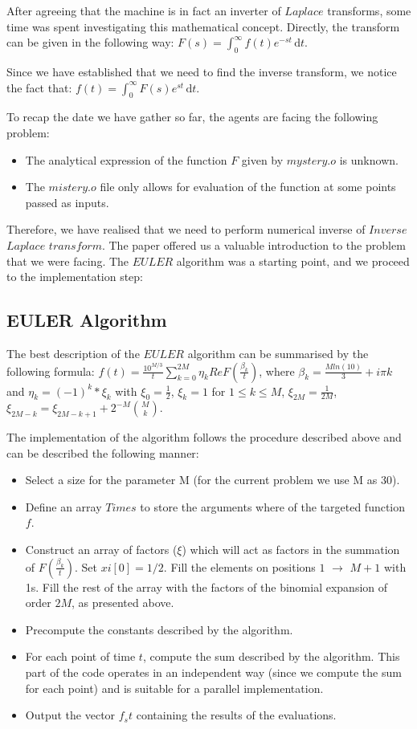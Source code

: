 After agreeing that the machine is in fact an inverter of $Laplace$ transforms, some time was spent investigating 
this mathematical concept. Directly, the transform can be given in the following way:
$F(s) =\int_0^\infty \! f(t)e^{-st} \, \mathrm{d}t$.

Since we have established that we need to find the inverse transform, we notice the fact that:
$f(t) =\int_0^\infty \! F(s)e^{st} \, \mathrm{d}t$. 
\newline

To recap the date we have  gather so far, the agents are facing the following problem:
\begin{itemize}
\item{The analytical expression of the function $F$ given by $mystery.o$ is unknown. }
\item{The $mistery.o$ file only allows for evaluation of the function at some points passed as inputs. }
\end{itemize}

Therefore, we have realised that we need to perform numerical inverse of $Inverse$ $Laplace$ $transform$.
The paper offered us a valuable introduction to the problem that we were facing.
The $EULER$ algorithm was a starting point, and we proceed to the implementation step:

\subsection{EULER Algorithm}
The best description\cite{abate} of the $EULER$ algorithm can be summarised by the following formula:
$f(t) = \frac{10^{M/3}}{t} \sum\limits_{k=0}^{2M} {\eta_k Re F(\frac{\beta_k}{t}) }$, where $\beta_k = \frac{M ln(10)}{3} + i\pi k$ and $\eta_k = (-1)^{k} *\xi_k$ with $\xi_0 = \frac{1}{2}$, $\xi_k = 1$ for $1 \leq k \leq M$, $\xi_{2M} = \frac{1}{2M}$, $\xi_{2M-k} = \xi_{2M-k+1}+2^{-M}\binom{M}{k}$.
\newline

The implementation of the algorithm follows the procedure described above and can be described the following manner:
\begin{itemize}
\item{Select a size for the parameter M (for the current problem we use M as 30).}
\item{Define an array $Times$ to store the arguments where of the targeted function $f$.}
\item{Construct an array of factors ($\xi$) which will act as factors in the summation of $F(\frac{\beta_k}{t})$. Set $xi[0] = 1/2$. Fill the elements on positions $1$ $\to$ $M+1$ with 1s. Fill the rest of the array with the factors of the binomial expansion of order $2M$, as presented above.}
\item{Precompute the constants described by the algorithm.}
\item{For each point of time $t$, compute the sum described by the algorithm. This part of the code operates in an independent way (since we compute the sum for each point) and is suitable for a parallel implementation.}
\item{Output the vector $f_st$ containing the results of the evaluations.}
\end{itemize} 

